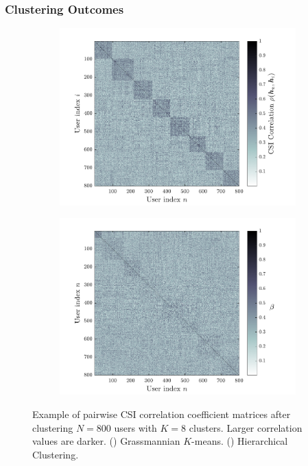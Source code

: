 \subsubsection{Clustering Outcomes}
\begin{figure}[ht]
\centering
\begin{subfigure}[b]{0.48\linewidth}
	\centering
	\includegraphics[width=.95\linewidth]{./figs/usch_figs/pairwise_corr_all_users_GKM_M8_N800_K8.pdf}
	\label{usch:fig:pwc_gkm_mac}
\end{subfigure}
\begin{subfigure}[b]{0.48\linewidth}
	\centering
	\includegraphics[width=.95\linewidth]{./figs/usch_figs/pairwise_corr_all_users_AHP_M8_N800_K8.pdf}
	 \label{usch:fig:pwc_AHP_mac}
\end{subfigure}
\caption[Example of pairwise CSI correlation coefficient matrices after clustering $N=800$ users with $K=8$ clusters.]{Example of pairwise CSI correlation coefficient matrices after clustering $N=800$ users with $K=8$ clusters. Larger correlation values are darker. 
	() Grassmannian $K$-means. () Hierarchical Clustering.}
\label{usch:fig:clusters_pwc_M8_N800}
\end{figure}
